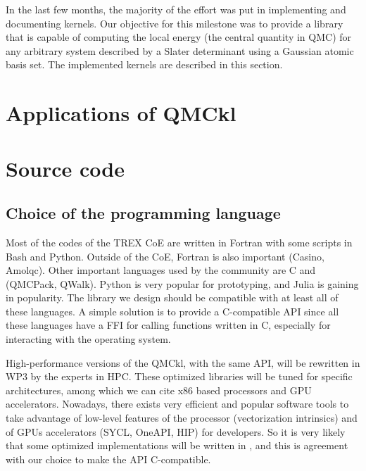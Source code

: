 In the last few months, the majority of the effort was put in
implementing and documenting kernels. Our objective for this milestone
was to provide a library that is capable of computing the local energy
(the central quantity in \ac{QMC}) for any arbitrary system described
by a Slater determinant using a Gaussian atomic basis set. The
implemented kernels are described in this section.


\section{Applications of QMCkl}




\section{Source code}

\subsection{Choice of the programming language}

Most of the codes of the \ac{TREX} \ac{CoE} are written in Fortran
with some scripts in Bash and Python. Outside of the
\ac{CoE}, Fortran is also important (Casino, Amolqc). Other
important languages used by the community are C and {\CC} (QMCPack,
QWalk). Python is very popular for prototyping, and Julia is gaining
in popularity\cite{poole_2020}. The library we design should be
compatible with at least all of these languages. A simple solution is
to provide a C-compatible \ac{API} since all these languages have a
\ac{FFI} for calling functions written in C, especially for
interacting with the operating system.

High-performance versions of the \ac{QMCkl}, with the same \ac{API},
will be rewritten in \ac{WP}3 by the experts in \ac{HPC}. These
optimized libraries will be tuned for specific architectures, among
which we can cite x86 based processors and \ac{GPU} accelerators.
Nowadays, there exists very efficient and popular software tools to
take advantage of low-level features of the processor\cite{pohl_2016}
(vectorization intrinsics) and of \acp{GPU} accelerators (SYCL\cite{SYCL},
OneAPI, HIP) for {\CC} developers. So it is very likely
that some optimized implementations will be written in {\CC}, and this
is agreement with our choice to make the \ac{API} C-compatible.

